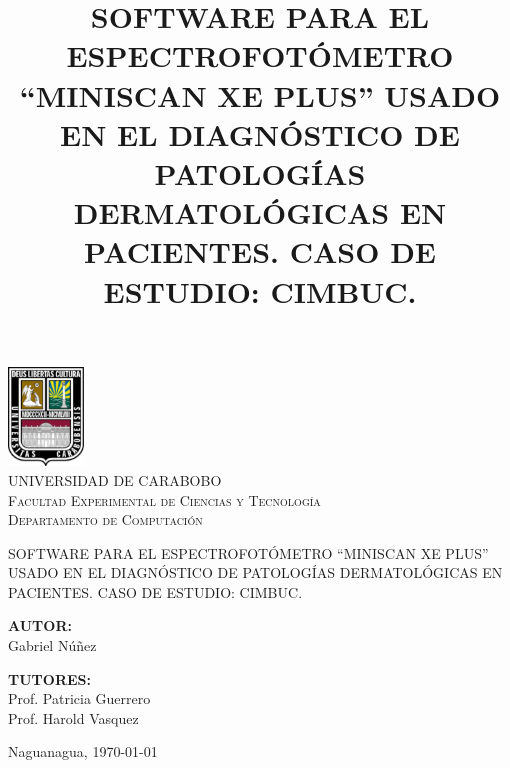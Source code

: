 \documentclass[12pt, a4paper]{article}
\title{SOFTWARE PARA EL ESPECTROFOT\'{O}METRO ``MINISCAN XE PLUS'' USADO EN EL DIAGN\'{O}STICO DE PATOLOG\'{I}AS DERMATOL\'{O}GICAS EN PACIENTES. CASO DE ESTUDIO: CIMBUC.}
\begin{document}
\begin{titlepage}
\begin{center}

\includegraphics[width=0.15\textwidth]{./img/logo-uc.png}~\\[1cm]

\textsc{ UNIVERSIDAD DE CARABOBO \\
Facultad Experimental de Ciencias y Tecnolog\'{i}a\\
Departamento de Computaci\'{o}n
}

\vfill

SOFTWARE PARA EL ESPECTROFOT\'{O}METRO ``MINISCAN XE PLUS'' USADO EN EL DIAGN\'{O}STICO DE PATOLOG\'{I}AS DERMATOL\'{O}GICAS EN PACIENTES. CASO DE ESTUDIO: CIMBUC.

\vfill
\textbf{AUTOR:}\\
Gabriel N\'{u}\~{n}ez

\textbf{TUTORES:} \\
Prof. Patricia Guerrero \\
Prof. Harold Vasquez

\vfill

Naguanagua, \today

\end{center}
\end{titlepage}
\end{document}

